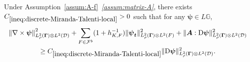 \documentclass[final,onefignum,onetabnum]{mousaviart}
\begin{document}
	\vspace*{1mm}
	\begin{lemma}
		\label{lem:discrete-Miranda-Talenti}
		Under Assumption~\ref{assum:A-f}~\textit{\ref{assum:matrix-A}}, there exists $C_{\ref{ineq:discrete-Miranda-Talenti-local}}>0$ such that 
		for any $\boldsymbol{\psi} \in L \mathbb{G}$,
		\begin{multline}
			\label{ineq:discrete-Miranda-Talenti-local}
			\left\| \nabla \times \boldsymbol{\psi} \right\|^2_{L^2_{\rho}(\boldsymbol{\Gamma}) \otimes L^2(\mathcal{D})} 
			+
			\sum_{F \in \mathcal{F}^b}
			(1+ h_{K,F}^{-1})
			\lVert \boldsymbol{\psi}_{\boldsymbol{t}} \rVert^2_{L^2_{\rho}(\boldsymbol{\Gamma}) \otimes L^2(F)}
			+
			\lVert \boldsymbol{A}:\mathrm{D} \boldsymbol{\psi} \rVert^2_{ L^2_{\rho}(\boldsymbol{\Gamma}) \otimes L^2(\mathcal{D})}
			\\
			\geq
			C_{\ref{ineq:discrete-Miranda-Talenti-local}}
			\lVert \mathrm{D} \boldsymbol{\psi} \rVert^2_{L^2_{\rho}(\boldsymbol{\Gamma}) \otimes L^2(\mathcal{D})} .
		\end{multline}
	\end{lemma}
	
\end{document}
